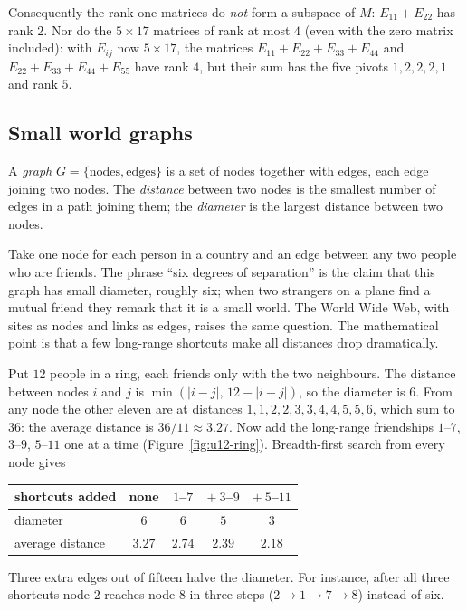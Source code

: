 Consequently the rank-one matrices do \emph{not} form a subspace of $M$: $E_{11}+E_{22}$ has rank $2$.
Nor do the $5\times17$ matrices of rank at most $4$ (even with the zero matrix included): with
$E_{ij}$ now $5\times17$, the matrices $E_{11}+E_{22}+E_{33}+E_{44}$ and
$E_{22}+E_{33}+E_{44}+E_{55}$ have rank $4$, but their sum has the five pivots $1,2,2,2,1$ and rank
$5$.

\subsection{Small world graphs}

\begin{definition}\label{def:u12-graph}
A \emph{graph} $G=\{\text{nodes},\text{edges}\}$ is a set of nodes together with edges, each edge
joining two nodes. The \emph{distance} between two nodes is the smallest number of edges in a path
joining them; the \emph{diameter} is the largest distance between two nodes.
\end{definition}

Take one node for each person in a country and an edge between any two people who are friends. The
phrase ``six degrees of separation'' is the claim that this graph has small diameter, roughly six;
when two strangers on a plane find a mutual friend they remark that it is a small world. The World
Wide Web, with sites as nodes and links as edges, raises the same question. The mathematical point
is that a few long-range shortcuts make all distances drop dramatically.

\begin{example}\label{ex:u12-ring}
Put $12$ people in a ring, each friends only with the two neighbours. The distance between nodes
$i$ and $j$ is $\min(|i-j|,\,12-|i-j|)$, so the diameter is $6$. From any node the other eleven are
at distances $1,1,2,2,3,3,4,4,5,5,6$, which sum to $36$: the average distance is
$36/11\approx3.27$. Now add the long-range friendships $1$--$7$, $3$--$9$, $5$--$11$ one at a time
(Figure~\ref{fig:u12-ring}). Breadth-first search from every node gives
\begin{center}
\begin{tabular}{@{}lcccc@{}}
\toprule
shortcuts added & none & $1$--$7$ & $+\ 3$--$9$ & $+\ 5$--$11$\\
\midrule
diameter & $6$ & $6$ & $5$ & $3$\\
average distance & $3.27$ & $2.74$ & $2.39$ & $2.18$\\
\bottomrule
\end{tabular}
\end{center}
Three extra edges out of fifteen halve the diameter. For instance, after all three shortcuts node
$2$ reaches node $8$ in three steps ($2\to1\to7\to8$) instead of six.
\end{example}


